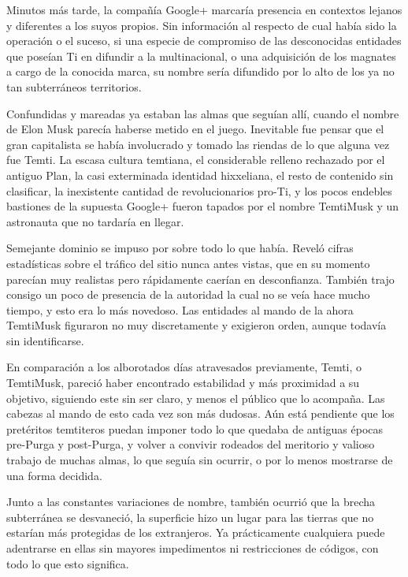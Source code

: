\documentclass[
  spanish,
]{book}
\begin{document}
Minutos más tarde, la compañía Google+ marcaría presencia en contextos lejanos y diferentes a los suyos propios. Sin información al respecto de cual había sido la operación o el suceso, si una especie de compromiso de las desconocidas entidades que poseían Ti en difundir a la multinacional, o una adquisición de los magnates a cargo de la conocida marca, su nombre sería difundido por lo alto de los ya no tan subterráneos territorios.

Confundidas y mareadas ya estaban las almas que seguían allí, cuando el nombre de Elon Musk parecía haberse metido en el juego. Inevitable fue pensar que el gran capitalista se había involucrado y tomado las riendas de lo que alguna vez fue Temti.
La escasa cultura temtiana, el considerable relleno rechazado por el antiguo Plan, la casi exterminada identidad hixxeliana, el resto de contenido sin clasificar, la inexistente cantidad de revolucionarios pro-Ti, y los pocos endebles bastiones de la supuesta Google+ fueron tapados por el nombre TemtiMusk y un astronauta que no tardaría en llegar.

Semejante dominio se impuso por sobre todo lo que había. Reveló cifras estadísticas sobre el tráfico del sitio nunca antes vistas, que en su momento parecían muy realistas pero rápidamente caerían en desconfianza. También trajo consigo un poco de presencia de la autoridad la cual no se veía hace mucho tiempo, y esto era lo más novedoso. Las entidades al mando de la ahora TemtiMusk figuraron no muy discretamente y exigieron orden, aunque todavía sin identificarse.

En comparación a los alborotados días atravesados previamente, Temti, o TemtiMusk, pareció haber encontrado estabilidad y más proximidad a su objetivo, siguiendo este sin ser claro, y menos el público que lo acompaña. Las cabezas al mando de esto cada vez son más dudosas. Aún está pendiente que los pretéritos temtiteros puedan imponer todo lo que quedaba de antiguas épocas pre-Purga y post-Purga, y volver a convivir rodeados del meritorio y valioso trabajo de muchas almas, lo que seguía sin ocurrir, o por lo menos mostrarse de una forma decidida.

Junto a las constantes variaciones de nombre, también ocurrió que la brecha subterránea se desvaneció, la superficie hizo un lugar para las tierras que no estarían más protegidas de los extranjeros. Ya prácticamente cualquiera puede adentrarse en ellas sin mayores impedimentos ni restricciones de códigos, con todo lo que esto significa.
\end{document}

